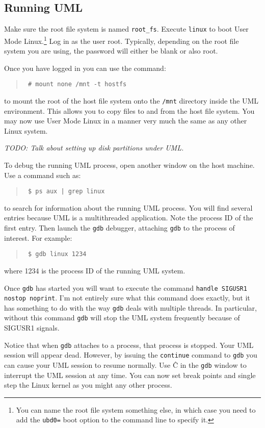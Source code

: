\documentclass{article}
\newcommand{\command}[1]{\texttt{#1}}
\newcommand{\filename}[1]{\texttt{#1}}
\newcommand{\todo}[1]{\textit{TODO: #1}}
\newenvironment{commands}
  {\begin{quote} \tt}
  {\end{quote}}
\begin{document}
\subsection{Running UML}

Make sure the root file system is named \filename{root\_fs}. Execute \command{linux} to boot
User Mode Linux.\footnote{You can name the root file system something else, in which case you
  need to add the \texttt{ubd0=} boot option to the command line to specify it.} Log in as the
user root. Typically, depending on the root file system you are using, the password will either
be blank or also root.

Once you have logged in you can use the command:
\begin{commands}
  \# mount none /mnt -t hostfs
\end{commands}
to mount the root of the host file system onto the \filename{/mnt} directory inside the UML
environment. This allows you to copy files to and from the host file system. You may now use
User Mode Linux in a manner very much the same as any other Linux system.

\todo{Talk about setting up disk partitions under UML.}

To debug the running UML process, open another window on the host machine. Use a command such
as:
\begin{commands}
  \$ ps aux | grep linux
\end{commands}
to search for information about the running UML process. You will find several entries because
UML is a multithreaded application. Note the process ID of the first entry. Then launch the
\command{gdb} debugger, attaching \command{gdb} to the process of interest. For example:
\begin{commands}
  \$ gdb linux 1234
\end{commands}
where 1234 is the process ID of the running UML system.

Once \command{gdb} has started you will want to execute the command \command{handle SIGUSR1
  nostop noprint}. I'm not entirely sure what this command does exactly, but it has something to
do with the way \command{gdb} deals with multiple threads. In particular, without this command
\command{gdb} will stop the UML system frequently because of SIGUSR1 signals.

Notice that when \command{gdb} attaches to a process, that process is stopped. Your UML session
will appear dead. However, by issuing the \command{continue} command to \command{gdb} you can
cause your UML session to resume normally. Use \^C in the \command{gdb} window to interrupt the
UML session at any time. You can now set break points and single step the Linux kernel as you
might any other process.
\end{document}
